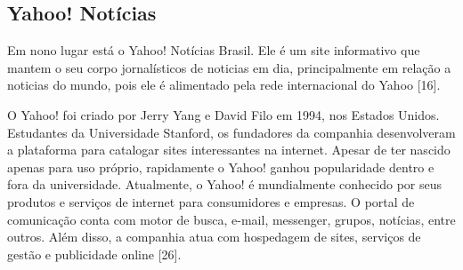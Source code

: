 \documentclass[a4paper]{article}
\begin{document}
\begin{titlepage}
\subsection{Yahoo! Notícias}

Em nono lugar está o Yahoo! Notícias Brasil. Ele é um site informativo que mantem o seu corpo jornalísticos de noticias em dia, principalmente em relação a noticias do mundo, pois ele é alimentado pela rede internacional do Yahoo [16].

O Yahoo! foi criado por Jerry Yang e David Filo em 1994, nos Estados Unidos. Estudantes da Universidade Stanford, os fundadores da companhia desenvolveram a plataforma para catalogar sites interessantes na internet. Apesar de ter nascido apenas para uso próprio, rapidamente o Yahoo! ganhou popularidade dentro e fora da universidade. Atualmente, o Yahoo! é mundialmente conhecido por seus produtos e serviços de internet para consumidores e empresas. O portal de comunicação conta com motor de busca, e-mail, messenger, grupos, notícias, entre outros. Além disso, a companhia atua com hospedagem de sites, serviços de gestão e publicidade online [26].


\end{titlepage}
\end{document}
